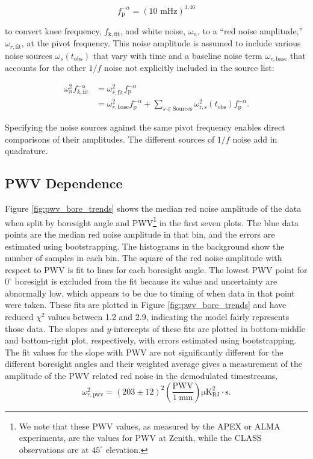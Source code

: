 \documentclass[twocolumn, tighten, numberedappendix, twocolappendix]{aastex63}
\begin{document}
\begin{equation}
    f_\mathrm{p}^{-\alpha} = (10\text{ mHz})^{1.46}
\end{equation}

\noindent to convert knee frequency, $f_\mathrm{k,\mathrm{fit}}$, and white noise, $\omega_n$, to a ``red noise amplitude,'' $\omega_{r,\mathrm{fit}}$, at the pivot frequency. This noise amplitude is assumed to include various noise sources $\omega_s(t_\mathrm{obs})$ that vary with time and a baseline noise term $\omega_{r,\mathrm{base}}$ that accounts for the other $1/f$ noise not explicitly included in the source list:

\begin{equation}
\begin{aligned}
    \omega_n^2 f_{k,\mathrm{fit}}^{-\alpha} 
    &= \omega_{r,\mathrm{fit}}^2 f_\mathrm{p}^{-\alpha} \\
    &= \omega_{r,\mathrm{base}}^2 f_\mathrm{p}^{-\alpha}
    + \sum_{ s\in \mathrm{Sources}} \omega_\mathrm{r,s}^2(t_\mathrm{obs}) f_\mathrm{p}^{-\alpha}.
\end{aligned}
\end{equation}

\noindent Specifying the noise sources against the same pivot frequency enables direct comparisons of their amplitudes. The different sources of $1/f$ noise add in quadrature. 

\subsection{PWV Dependence}
 Figure \ref{fig:pwv_bore_trends} shows the median red noise amplitude of the data when split by boresight angle and PWV\footnote{We note that these PWV values, as measured by the APEX or ALMA experiments, are the values for PWV at Zenith, while the CLASS observations are at $45^\circ$ elevation.} in the first seven plots. The blue data points are the median red noise amplitude in that bin, and the errors are estimated using bootstrapping. The histograms in the background show the number of samples in each bin. The square of the red noise amplitude with respect to PWV is fit to lines for each boresight angle. The lowest PWV point for $0^\circ$ boresight is excluded from the fit because its value and uncertainty are abnormally low, which appears to be due to timing of when data in that point were taken. These fits are plotted in Figure \ref{fig:pwv_bore_trends} and have reduced $\chi^2$ values between 1.2 and 2.9, indicating the model fairly represents those data. The slopes and $y$-intercepts of these fits are plotted in bottom-middle and bottom-right plot, respectively, with errors estimated using bootstrapping. The fit values for the slope with PWV are not significantly different for the different boresight angles and their weighted average gives a measurement of the amplitude of the PWV related red noise in the demodulated timestreams,
\begin{equation}
    \omega^2_{r,\mathrm{pwv}} = (203 \pm 12)^2 \left( \frac{\mathrm{PWV}}{1~\mathrm{mm}} \right) \mathrm{\mu K_{RJ}^2 \cdot s}.
\label{eq:pwv_trend}
\end{equation}
\end{document}
